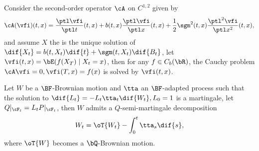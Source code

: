 \documentclass[article, a4paper, twoside]{universal}
\begin{document}
\begin{thm}[1.5.6.1]
    Consider the second-order operator $\cA$ on $C^{1,2}$ given by
    \[
        \cA(\vfi)(t,x)=\frac{\ptl\vfi}{\ptl t}(t,x)+b(t,x)\frac{\ptl\vfi}{\ptl x}(t,x)+\frac{1}{2}\sgm^{2}(t,x)\frac{\ptl^{2}\vfi}{\ptl x^{2}}(t,x),
    \]
    and assume $X$ the is the unique solution of $\dif{X_{t}}=b(t,X_{t})\dif{t}+\sgm(t,X_{t})\dif{B_{t}}$, let $\vfi(t,x)=\bE(f(X_{T})\mid X_{t}=x)$, then for any $f\in C_{b}(\bR)$, the Cauchy problem $\cA\vfi=0,\vfi(T,x)=f(x)$ is solved by $\vfi(t,x)$.
\end{thm}

\begin{thm}
    Let $W$ be a $\BF$-Brownian motion and $\tta$ an $\BF$-adapted process such that the solution to $\dif{L_{t}}=-L_{t}\tta_{t}\dif{W_{t}}, L_{0}=1$ is a martingale, let $Q|_{\cF_{t}}=L_{t}P|_{\cF_{t}}$, then $W$ admits a $Q$-semi-martingale decomposition
    \[
        W_{t}=\oT{W_{t}}-\int_{0}^{t}\tta_{s}\dif{s},
    \]
    where $\oT{W}$ becomes a $\bQ$-Brownian motion.
\end{thm}

\printref
\end{document}
